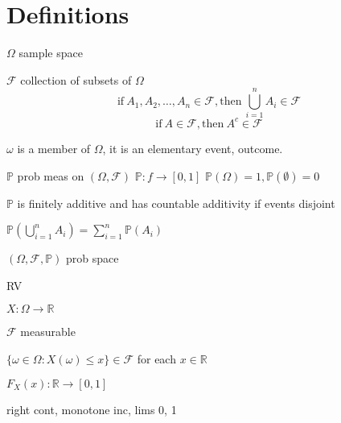 \documentclass[twocolumn]{amsart}
\renewcommand{\P}{\mathbb{P}}
\begin{document}
\section*{Definitions}
$\Omega$ sample space

$\mathcal{F}$ collection of subsets of $\Omega$
\begin{equation*}
  \text{if}~A_{1},A_{2},\ldots,A_{n}\in\mathcal{F},\text{then}~\bigcup_{i=1}^{n}A_{i}\in\mathcal{F}
\end{equation*}
\begin{equation*}
  \text{if}~A\in\mathcal{F},\text{then}~A^{c}\in\mathcal{F}
\end{equation*}

$\omega$ is a member of $\Omega$, it is an elementary event, outcome.

$\P$ prob meas on $(\Omega, \mathcal{F})$ $\P:f\rightarrow [0,1]$  $\P(\Omega)=1,\P(\emptyset)=0$

$\P$ is finitely additive and has countable additivity if events disjoint

$\P\left(\bigcup_{i=1}^{n}A_{i}\right)=\sum_{i=1}^{n}\P(A_{i})$

$(\Omega,\mathcal{F},\P)$ prob space

RV

$X: \Omega \rightarrow \mathbb{R}$

$\mathcal{F}$ measurable

$\{\omega \in \Omega : X(\omega) \leq x\} \in \mathcal{F}$ for each $x\in\mathbb{R}$

$F_{X}(x):\mathbb{R}\rightarrow [0,1]$

right cont, monotone inc, lims 0, 1
\end{document}
